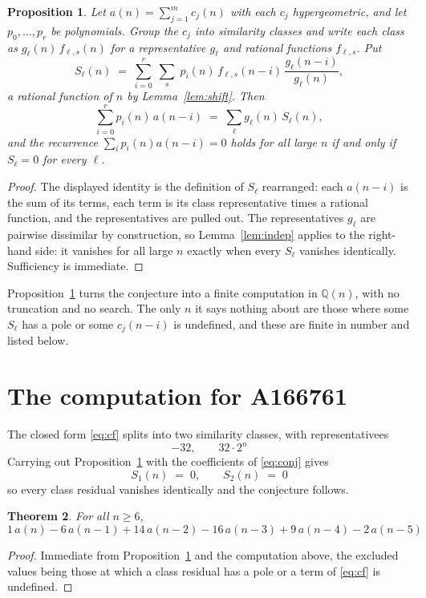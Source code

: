 \documentclass[11pt,a4paper]{article}
\theoremstyle{plain}
\newtheorem{theorem}{Theorem}
\newtheorem{proposition}[theorem]{Proposition}
\theoremstyle{definition}
\begin{document}
\begin{proposition}\label{prop:main}
Let $a(n)=\sum_{j=1}^{m}c_{j}(n)$ with each $c_{j}$ hypergeometric, and let
$p_{0},\dots,p_{r}$ be polynomials. Group the $c_{j}$ into similarity classes and write
each class as $g_{\ell}(n)\,f_{\ell,s}(n)$ for a representative $g_{\ell}$ and rational
functions $f_{\ell,s}$. Put
\[
S_{\ell}(n)\;=\;\sum_{i=0}^{r}\;\sum_{s}\;p_{i}(n)\,f_{\ell,s}(n-i)\,
\frac{g_{\ell}(n-i)}{g_{\ell}(n)} ,
\]
a rational function of $n$ by Lemma~\ref{lem:shift}. Then
\[
\sum_{i=0}^{r}p_{i}(n)\,a(n-i)\;=\;\sum_{\ell}g_{\ell}(n)\,S_{\ell}(n),
\]
and the recurrence $\sum_{i}p_{i}(n)a(n-i)=0$ holds for all large $n$ if and only if
$S_{\ell}=0$ for every $\ell$.
\end{proposition}

\begin{proof}
The displayed identity is the definition of $S_{\ell}$ rearranged: each $a(n-i)$ is the
sum of its terms, each term is its class representative times a rational function, and the
representatives are pulled out. The representatives $g_{\ell}$ are pairwise dissimilar by
construction, so Lemma~\ref{lem:indep} applies to the right-hand side: it vanishes for all
large $n$ exactly when every $S_{\ell}$ vanishes identically. Sufficiency is immediate.
\end{proof}

Proposition~\ref{prop:main} turns the conjecture into a finite computation in
$\mathbb{Q}(n)$, with no truncation and no search. The only $n$ it says nothing about are
those where some $S_{\ell}$ has a pole or some $c_{j}(n-i)$ is undefined, and these are
finite in number and listed below.

\section{The computation for A166761}

The closed form \eqref{eq:cf} splits into two similarity classes, with
representativees
\[
-32,\qquad 32 \cdot 2^{n}
\]
Carrying out Proposition~\ref{prop:main} with the coefficients of \eqref{eq:conj} gives
\[
S_{1}(n)\;=\;0,\qquad S_{2}(n)\;=\;0
\]
so every class residual vanishes identically and the conjecture follows.

\begin{theorem}
For all $n\ge 6$,
\[
1\,a(n) - 6\,a(n-1) + 14\,a(n-2) - 16\,a(n-3) + 9\,a(n-4) - 2\,a(n-5)
\]
\end{theorem}

\begin{proof}
Immediate from Proposition~\ref{prop:main} and the computation above, the excluded values
being those at which a class residual has a pole or a term of \eqref{eq:cf} is undefined.
\end{proof}
\end{document}
